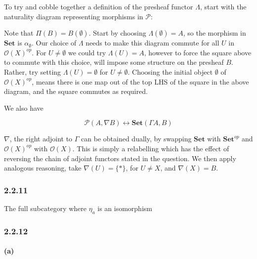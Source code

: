 \documentclass{article}
\begin{document}
To try and cobble together a definition of the presheaf functor $\Lambda$, start with the naturality diagram representing morphisms in $\mathcal{P}$:

\begin{center}
\end{center}

Note that $\Pi (B) = B(\emptyset)$. Start by choosing $\Lambda(\emptyset) = A$, so the morphism in $\mathbf{Set}$ is $\alpha_\emptyset$. Our choice of $\Lambda$ needs to make this diagram commute for all $U$ in $\mathcal{O}(X)^{op}$. For $U \neq \emptyset$ we could try $\Lambda(U) = A$, however to force the square above to commute with this choice, will impose some structure on the presheaf $B$. Rather, try setting  $\Lambda(U) = \emptyset$ for $U \neq \emptyset$. Choosing the initial object $\emptyset$ of $\mathcal{O}(X)^{op}$, means there is one map out of the top LHS of the square in the above diagram, and the square commutes as required.

We also have

\begin{equation*}
  \mathcal{P}(A, \nabla B) \leftrightarrow \mathbf{Set}(\Gamma A, B)
\end{equation*}

$\nabla$, the right adjoint to $\Gamma$ can be obtained dually, by swapping $\mathbf{Set}$ with $\mathbf{Set}^{op}$ and $\mathcal{O}(X)^{op}$ with $\mathcal{O}(X)$. This is simply a relabelling which has the effect of reversing the chain of adjoint functors stated in the question. We then apply analogous reasoning, take $\nabla(U) = \{*\}$, for $U \neq X$, and $\nabla(X) = B$.


\subsubsection*{2.2.11}
The full subcategory where $\eta_a$ is an isomorphism

\subsubsection*{2.2.12}
\paragraph{(a)}
\end{document}

